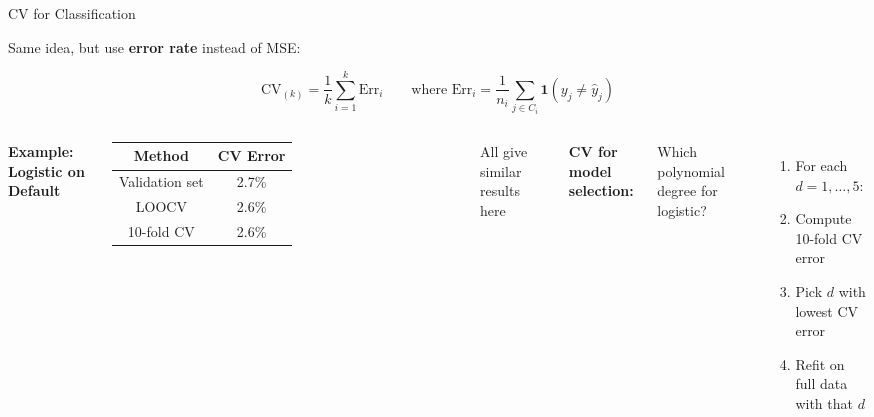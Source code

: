\documentclass[aspectratio=169, 11pt]{beamer}
\begin{document}
\begin{frame}{CV for Classification}

Same idea, but use \textbf{error rate} instead of MSE:

$$\text{CV}_{(k)} = \frac{1}{k}\sum_{i=1}^{k}\text{Err}_i \qquad \text{where } \text{Err}_i = \frac{1}{n_i}\sum_{j \in C_i} \mathbf{1}(y_j \neq \hat{y}_j)$$

\begin{columns}
\textbf{Example: Logistic on Default}

\vspace{0.3em}
\begin{tabular}{cc}
\toprule
Method & CV Error \\
\midrule
Validation set & 2.7\% \\
LOOCV & 2.6\% \\
10-fold CV & 2.6\% \\
\bottomrule
\end{tabular}

\vspace{0.3em}
All give similar results here

\textbf{CV for model selection:}

Which polynomial degree for logistic?

\vspace{0.3em}
\begin{enumerate}
  \item For each $d = 1, \ldots, 5$:
  \item[] \quad Compute 10-fold CV error
  \item Pick $d$ with lowest CV error
  \item Refit on full data with that $d$
\end{enumerate}
\end{columns}
\end{frame}
\end{document}
